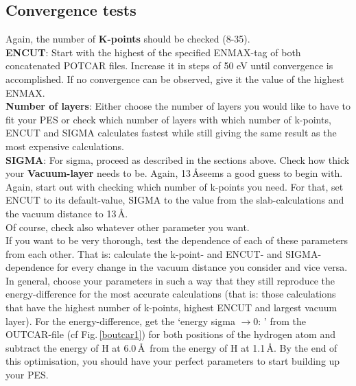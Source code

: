 \documentclass[twoside, 11pt, titlepage, captions=nooneline, a4paper, headsepline]{scrbook}%
\begin{document}
\subsection{Convergence tests}
Again, the number of \textbf{K-points} should be checked (8-35).\\
\textbf{ENCUT}: Start with the highest of the specified ENMAX-tag of both concatenated POTCAR files. Increase it in steps of 50 eV until convergence is accomplished. If no convergence can be observed, give it the value of the highest ENMAX.\\
\textbf{Number of layers}: Either choose the number of layers you would like to have to fit your PES or check which number of layers with which number of k-points, ENCUT and SIGMA calculates fastest while still giving the same result as the most expensive calculations.\\
\textbf{SIGMA}: For sigma, proceed as described in the sections above. Check how thick your \textbf{Vacuum-layer} needs to be. Again, 13\,\AA seems a good guess to begin with.\\
Again, start out with checking which number of k-points you need. For that, set ENCUT to its default-value, SIGMA to the value from the slab-calculations and the vacuum distance to 13\,\AA.\\
Of course, check also whatever other parameter you want.\\
If you want to be very thorough, test the dependence of each of these parameters from each other. That is: calculate the k-point- and ENCUT- and SIGMA-dependence for every change in the vacuum distance you consider and vice versa.\\
In general, choose your parameters in such a way that they still reproduce the energy-difference for the most accurate calculations (that is: those calculations that have the highest number of k-points, highest ENCUT and largest vacuum layer). For the energy-difference, get the `energy sigma $\rightarrow 0$: ' from the OUTCAR-file (cf Fig.\,\ref{boutcar1}) for both positions of the hydrogen atom and subtract the energy of H at 6.0\,\AA~from the energy of H at 1.1\,\AA.
By the end of this optimisation, you should have your perfect parameters to start building up your PES.\\
\end{document}
